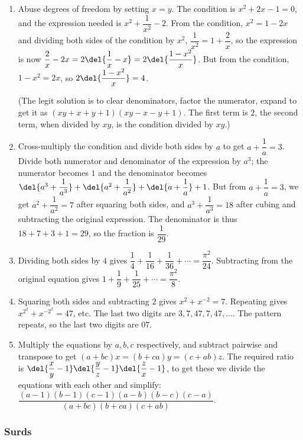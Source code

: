 \documentclass[10pt,paper=letter]{scrartcl}
\begin{document}
\begin{enumerate}
\item Abuse degrees of freedom by setting $x = y$. The condition is $x^2 + 2x - 1 = 0$, and the expression needed is $x^2 + \dfrac1{x^2} - 2$. From the condition, $x^2 = 1 - 2x$ and dividing both sides of the condition by $x^2$, $\dfrac1{x^2} = 1 + \dfrac2x$, so the expression is now $\dfrac2x - 2x = 2\del{\dfrac1x - x} = 2\del{\dfrac{1 - x^2}{x}}$. But from the condition, $1 - x^2 = 2x$, so $2\del{\dfrac{1 - x^2}{x}} = 4$.

(The legit solution is to clear denominators, factor the numerator, expand to get it as $(xy + x + y + 1)(xy - x - y + 1)$. The first term is $2$, the second term, when divided by $xy$, is the condition divided by $xy$.)

\item Cross-multiply the condition and divide both sides by $a$ to get $a + \dfrac1a = 3$. Divide both numerator and denominator of the expression by $a^3$; the numerator becomes $1$ and the denominator becomes $\del{a^3 + \dfrac1{a^3}} + \del{a^2 + \dfrac1{a^2}} + \del{a + \dfrac1a} + 1$. But from $a + \dfrac1a = 3$, we get $a^2 + \dfrac1{a^2} = 7$ after squaring both sides, and $a^3 + \dfrac1{a^3} = 18$ after cubing and subtracting the original expression. The denominator is thus $18 + 7 + 3 + 1 = 29$, so the fraction is $\dfrac1{29}$.

\item Dividing both sides by $4$ gives $\dfrac14 + \dfrac1{16} + \dfrac1{36} + \cdots = \dfrac{\pi^2}{24}$. Subtracting from the original equation gives $1 + \dfrac19 + \dfrac1{25} + \cdots = \dfrac{\pi^2}8$.

\item Squaring both sides and subtracting $2$ gives $x^2 + x^{-2} = 7$. Repeating gives $x^{2^2} + x^{-2^2} = 47$, etc. The last two digits are $3, 7, 47, 7, 47, \ldots$. The pattern repeats, so the last two digits are $07$.

\item Multiply the equations by $a, b, c$ respectively, and subtract pairwise and transpose to get $(a+bc)x = (b+ca)y = (c+ab)z$. The required ratio is $\del{\dfrac{x}y - 1}\del{\dfrac{y}z - 1}\del{\dfrac{z}x - 1}$, to get these we divide the equations with each other and simplify: $\dfrac{(a-1)(b-1)(c-1)(a-b)(b-c)(c-a)}{(a+bc)(b+ca)(c+ab)}$.

\end{enumerate}

\subsubsection*{Surds}
\end{document}
